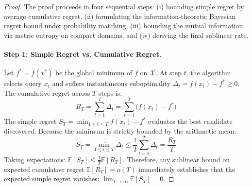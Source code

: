\documentclass{article}
\begin{document}
\begin{proof}
The proof proceeds in four sequential steps: (i) bounding simple regret by average cumulative regret, (ii) formulating the information-theoretic Bayesian regret bound under probability matching, (iii) bounding the mutual information via metric entropy on compact domains, and (iv) deriving the final sublinear rate.

\paragraph{Step 1: Simple Regret vs. Cumulative Regret.}
Let $f^* = f(x^*)$ be the global minimum of $f$ on $\mathcal{X}$. At step $t$, the algorithm selects query $x_t$ and suffers instantaneous suboptimality $\Delta_t = f(x_t) - f^* \ge 0$. The cumulative regret across $T$ steps is:
\begin{equation}
R_T = \sum_{t=1}^T \Delta_t = \sum_{t=1}^T \big(f(x_t) - f^*\big)
\end{equation}
The simple regret $S_T = \min_{1 \le t \le T} f(x_t) - f^*$ evaluates the best candidate discovered. Because the minimum is strictly bounded by the arithmetic mean:
\begin{equation}
\label{eq:simple_vs_cum}
S_T = \min_{1 \le t \le T} \Delta_t \le \frac{1}{T} \sum_{t=1}^T \Delta_t = \frac{R_T}{T}
\end{equation}
Taking expectations: $\mathbb{E}[S_T] \le \frac{1}{T}\mathbb{E}[R_T]$. Therefore, any sublinear bound on expected cumulative regret $\mathbb{E}[R_T] = o(T)$ immediately establishes that the expected simple regret vanishes: $\lim_{T \to \infty} \mathbb{E}[S_T] = 0$.


\end{proof}
\end{document}
